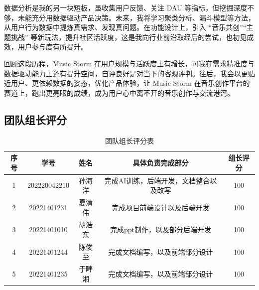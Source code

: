 \documentclass{base}
\numberwithin{figure}{section} %
\begin{document}
数据分析是我的另一块短板，虽收集用户反馈、关注 DAU 等指标，但挖掘深度不够，未能充分用数据驱动产品决策。未来，我将学习聚类分析、漏斗模型等方法，从用户行为数据中提炼真需求、发现真问题。在功能设计上，引入 “音乐共创”“主题挑战” 等新玩法，提升社区活跃度，这是我向行业前沿取经后的尝试，也初见成效，用户参与度有所提升。

回顾这段历程，Music Storm 在用户规模与活跃度上有增长，可我在需求精准度与数据驱动能力上还有提升空间，自评良好是对当下的客观评判。往后，我会以更贴近用户、更依赖数据的姿态，优化产品体验，让 Music Storm 在音乐创作平台的赛道上，跑出更亮眼的成绩，成为用户心中离不开的音乐创作与交流港湾。

\subsection{团队组长评分}

\begin{longtable}{@{}ccccc@{}}
\caption{团队组长评分表}
\label{tab:my-table}\\
\toprule
\textbf{序号} & \textbf{学号}  & \textbf{姓名} & \textbf{具体负责完成部分}    & \textbf{组长评分} \\* \midrule
\endhead
%
\bottomrule
\endfoot
%
\endlastfoot
%
1           & 202220042210 & 孙海洋         & 完成AI训练，后端开发，文档整合以及改写 & 100           \\
2           & 20221401231  & 夏清伟         & 完成项目前端设计以及后端开发       & 100           \\
3           & 20221401010  & 胡浩东         & 完成ppt制作，以及部分后端开发     & 100           \\
4           & 20221401244  & 陈俊至         & 完成文档编写，以及前端部分设计      & 100           \\
5           & 20221401235  & 于畔湘         & 完成文档编写，以及前端部分设计      & 100           \\* \bottomrule
\end{longtable}


\end{document}
